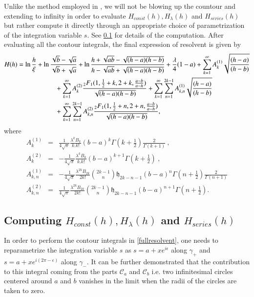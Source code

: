 \documentclass[3p,12pt]{elsarticle}
\numberwithin{equation}{section}
\begin{document}
Unlike the method employed in \cite{duttagopakumar}, we will not be blowing up the countour and extending to infinity in order to evaluate $H_{const}(h), H_{\lambda}(h)$ and $H_{series}(h)$ but rather compute it directly through an appropriate choice of parametrization of the integration variable $s$. See \ref{resolvent-calc} for details of the computation. After evaluating all the contour integrals, the final expression of resolvent is given by
%
\begin{equation} 
\label{resolvent-exact}
\begin{aligned}
 H(h)&=\ln \frac{h}{\xi}+\ln \frac{\sqrt{b}-\sqrt{a}}{\sqrt{b}+\sqrt{a}}+\ln \frac{h+\sqrt{ab}-\sqrt{(h-a)(h-b)}}{h-\sqrt{ab}+\sqrt{(h-a)(h-b)}}+\frac{\lambda}{4}(1-a)+\sum_{k=1}^{\infty}A_{k}^{(1)}\sqrt{\frac{(h-a)}{(h-b)}}\\&\hspace*{2cm}+\sum_{k=1}^{\infty}A_{k}^{(2)}\frac{_2F_1(1,\frac{1}{2}+k,2+k,\frac{a-b}{a-h})}{\sqrt{(h-a)(h-b)}}+\sum_{k=1}^{\infty}\sum_{n=1}^{2k-1}A_{k,n}^{(1)}\sqrt{\frac{(h-a)}{(h-b)}}\\&\hspace*{2cm}+\sum_{k=1}^{\infty}\sum_{n=1}^{2k-1}A_{k,n}^{(2)}\frac{_2F_1(1,\frac{1}{2}+n,2+n,\frac{a-b}{a-h})}{\sqrt{(h-a)(h-b)}} ,       
\end{aligned}
\end{equation}
%
where
%
\begin{eqnarray}\label{eq:Aks}
A_{k}^{(1)}&=&\frac{1}{4\sqrt{\pi}}\frac{\lambda^{k}B_{k}}{k.k!}(b-a)^{k}\Gamma(k+\frac{1}{2})\frac{2}{\Gamma(k+1)}\ ,\nonumber\\
A_{k}^{(2)}&=&-\frac{1}{4\sqrt{\pi}}\frac{\lambda^{k}B_{k}}{k.k!}(b-a)^{k+1}\Gamma(k+\frac{1}{2})\ ,\nonumber\\
A_{k,n}^{(1)}&=&-\frac{1}{4\sqrt{\pi}}\frac{\lambda^{2k}B_{2k}}{2k!}{2k-1 \choose n}\mathfrak{h}_{2k-n-1}(b-a)^{n}\Gamma(n+\frac{1}{2})\frac{2}{\Gamma(n+1)}\nonumber\\
A_{k,n}^{(2)}&=&\frac{1}{4\sqrt{\pi}}\frac{\lambda^{2k}B_{2k}}{2k!}{2k-1 \choose n}\mathfrak{h}_{2k-n-1}(b-a)^{n+1}\Gamma(n+\frac{1}{2}) .
\end{eqnarray}
%

\subsection{{Computing $H_{const}(h), H_{\lambda}(h)$ and $H_{series}(h)$}}
\label{resolvent-calc}
In order to perform the contour integrals in \eqref{fullresolvent}, one needs to reparametrize the integration variable $s$ as $s=a+xe^{i\epsilon}$ along $\gamma_{+}$ and $s=a+xe^{i(2\pi -\epsilon)}$ along $\gamma_{-}$. It can be further demonstrated that the contribution to this integral coming from the parts $\mathcal{C}_a$ and $\mathcal{C}_b$ i.e. two infinitesimal circles centered around $a$ and $b$ vanishes in the limit when the radii of the circles are taken to zero.
\end{document}
